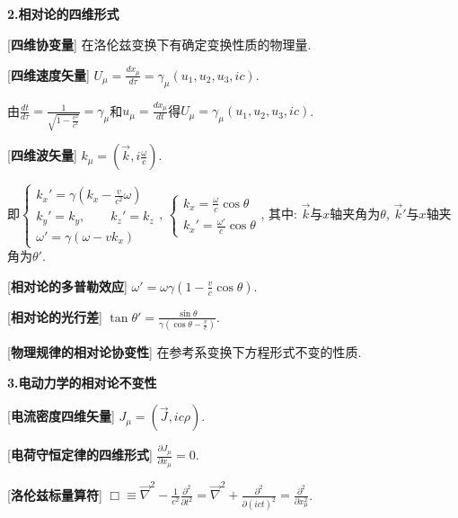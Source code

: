 \clearpage

\begin{center}
 \textbf{2.相对论的四维形式}
\end{center}

[\textbf{四维协变量}] 在洛伦兹变换下有确定变换性质的物理量.\par

[\textbf{四维速度矢量}] $U_\mu=\frac{dx_\mu}{d\tau}=\gamma_\mu(u_1,u_2,u_3,ic)$.\par
\qquad 由$\frac{dt}{d\tau}=\frac{1}{\sqrt{1-\frac{v^2}{c^2}}}=\gamma_\mu$和$u_\mu=\frac{dx_\mu}{dt}$得$U_\mu=\gamma_\mu(u_1,u_2,u_3,ic)$.\par

[\textbf{四维波矢量}] $k_\mu=(\vec k,i\frac{\omega}{c})$.\par
\qquad 即$\begin{cases}k_x'=\gamma(k_x-\frac{v}{c^2}\omega)\\k_y'=k_y,\qquad k_z'=k_z\\\omega'=\gamma(\omega-vk_x)\end{cases}$, $\begin{cases}k_x=\frac{\omega}{c}\cos\theta\\k_x'=\frac{\omega'}{c}\cos\theta \end{cases}$, 其中: $\vec k$与$x$轴夹角为$\theta$, $\vec k'$与$x$轴夹角为$\theta'$.\par

[\textbf{相对论的多普勒效应}] $\omega'=\omega\gamma(1-\frac{v}{c}\cos\theta)$.\par

[\textbf{相对论的光行差}] $\tan\theta'=\frac{\sin\theta}{\gamma(\cos\theta-\frac{v}{c})}$.\par

[\textbf{物理规律的相对论协变性}] 在参考系变换下方程形式不变的性质.\par

\begin{center}
 \textbf{3.电动力学的相对论不变性}
\end{center}

[\textbf{电流密度四维矢量}] $J_\mu=(\vec J,ic\rho)$.\par

[\textbf{电荷守恒定律的四维形式}] $\frac{\partial J_\mu}{\partial x_\mu}=0$.\par

[\textbf{洛伦兹标量算符}] $\Box\equiv \vec\nabla^2-\frac{1}{c^2}\frac{\partial^2}{\partial t^2}=\vec\nabla^2+\frac{\partial^2}{\partial(ict)^2}=\frac{\partial^2}{\partial x_\mu^2}$.\par

